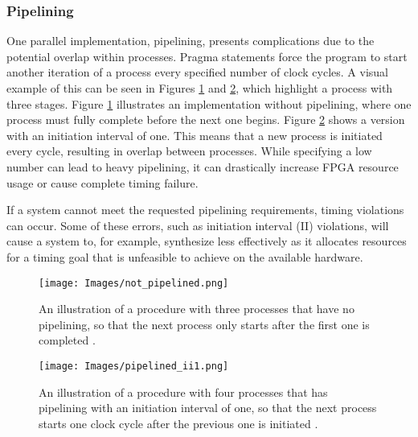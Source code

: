 \documentclass{article}
\begin{document}
        \subsubsection{Pipelining}
        \noindent One parallel implementation, pipelining, presents complications due to the potential overlap within processes. Pragma statements force the program to start another iteration of a process every specified number of clock cycles. A visual example of this can be seen in Figures \ref{fig:not_piped} and \ref{fig:ii_1_piped}, which highlight a process with three stages. Figure \ref{fig:not_piped} illustrates an implementation without pipelining, where one process must fully complete before the next one begins. Figure \ref{fig:ii_1_piped} shows a version with an initiation interval of one. This means that a new process is initiated every cycle, resulting in overlap between processes. While specifying a low number can lead to heavy pipelining, it can drastically increase FPGA resource usage or cause complete timing failure. 
        \par If a system cannot meet the requested pipelining requirements, timing violations can occur. Some of these errors, such as initiation interval (II) violations, will cause a system to, for example, synthesize less effectively as it allocates resources for a timing goal that is unfeasible to achieve on the available hardware. 
        \begin{figure}[!tb] 
            \centering
            \texttt{[image: Images/not\_pipelined.png]} 
            \caption{An illustration of a procedure with three processes that have no pipelining, so that the next process only starts after the first one is completed \cite{siemens_pipelining_nodate}.} 
            \label{fig:not_piped} 
        \end{figure}
        \begin{figure}[!tb] 
            \centering
            \texttt{[image: Images/pipelined\_ii1.png]} 
            \caption{An illustration of a procedure with four processes that has pipelining with an initiation interval of one, so that the next process starts one clock cycle after the previous one is initiated \cite{siemens_pipelining_nodate}.} 
            \label{fig:ii_1_piped} 
        \end{figure}
        
\end{document}
